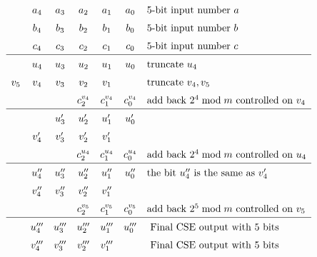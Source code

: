 \begin{figure*}[h!tb]
\begin{displaymath}
\renewcommand\arraystretch{1.5}
\begin{array}{ccccccl}
        & a_4 & a_3 & a_2 & a_1 & a_0 & 5\text{-bit input number } a\\
        & b_4 & b_3 & b_2 & b_1 & b_0 & 5\text{-bit input number } b\\
        & c_4 & c_3 & c_2 & c_1 & c_0 & 5\text{-bit input number } c\\
\hline
        & u_4 & u_3 & u_2 & u_1 & u_0 & \text{truncate } u_{4} \\
    v_5 & v_4 & v_3 & v_2 & v_1 &     & \text{truncate } v_{4},v_{5} \\
        &     &     & c^{v_4}_2 & c^{v_4}_1 & c^{v_4}_0 & \text{add back } 2^4 \bmod m \text{ controlled on } v_4 \\
\hline
        &      & u'_3 & u'_2 & u'_1 & u'_0 & \\
        & v'_4 & v'_3 & v'_2 & v'_1 &      & \\
        &      &    & c^{u_4}_2 & c^{u_4}_1 & c^{u_4}_0  & \text{add back } 2^4 \bmod m \text{ controlled on } u_4 \\
\hline
        & u''_4 & u''_3 & u''_2 & u''_1 & u''_0 & \text{the bit } u''_4 \text{ is the same as } v'_4 \\
        & v''_4 & v''_3 & v''_2 & v''_1 &       &  \\
        &       &    & c^{v_5}_2 & c^{v_5}_1 & c^{v_5}_0 & \text{add back } 2^5 \bmod m \text{ controlled on } v_5 \\
\hline
        & u'''_4 & u'''_3 & u'''_2 & u'''_1 & u'''_0 & \text{ Final CSE output with } 5 \text{ bits}\\
        & v'''_4 & v'''_3 & v'''_2 & v'''_1 &        & \text{ Final CSE output with } 5 \text{ bits}\\
\end{array}

\end{displaymath}
\end{figure*}
